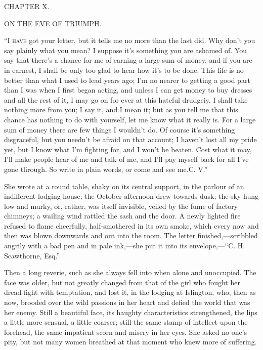 {}

{CHAPTER X.}

ON THE EVE OF TRIUMPH.

\textsc{``I have} got your letter, but it tells me no more than the last
did. Why don't you say plainly what you mean? I suppose it's something
you are ashamed of. You say that there's a chance for me of earning a
large sum of money, and if you are in earnest, I shall be only too glad
to hear how it's to be done. This life is no better than what I used to
lead years ago; I'm no nearer to getting a good part than I was when I
first began acting, and unless I can get money to buy dresses and all
the rest of it, I may go on for ever at this hateful drudgeiy. I shall
take nothing more from you; I say it, and I mean it; but as you tell me
that this chance has nothing to do with yourself, let me know what it
really is. For a large sum of money {}there are few things I wouldn't
do. Of course it's something disgraceful, but you needn't be afraid on
that account; I haven't lost all my pride yet, but I know what I'm
fighting for, and I won't be beaten. Cost what it may, I'll make people
hear of me and talk of me, and I'll pay myself back for all I've gone
tlirough. So write in plain words, or come and see me.{C. V.''}

She wrote at a round table, shaky on its central support, in the parlour
of an indifferent lodging-house; the October afternoon drew towards
dusk; the sky hung low and murky, or, rather, was itself invisible,
veiled by the fume of factory chimneys; a wailing wind rattled the sash
and the door. A newly lighted fire refused to flame cheerfully,
half-smothered in its own smoke, which every now and then was blown
downwards and out into the room. The letter finished,---scribbled
angrily with a bad pen and in pale ink,---she put it into its
envelope,---``C. H. Scawthorne, Esq.''

{}Then a long reverie, such as she always fell into when alone and
unoccupied. The face was older, but not greatly changed from that of the
girl who fought her dread fight with temptation, and lost it, in the
lodging at Islington, who, then as now, brooded over the wild passions
in her heart and defied the world that was her enemy. Still a beautiful
face, its haughty characteristics strengthened, the lips a little more
sensual, a little coarser; still the same stamp of intellect upon the
forehead, the same impatient scorn and misery in her eyes. She asked no
one's pity, but not many women breathed at that moment who knew more of
suffering.

